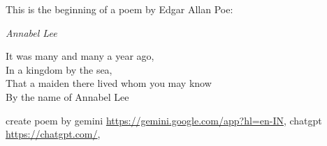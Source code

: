 \documentclass{article}
\begin{document}
\noindent This is the beginning of a poem by Edgar Allan Poe:
\begin{center}
	\emph{Annabel Lee}
\end{center}
\begin{center}
	It was many and many a year ago, \\
In a kingdom by the sea, \\
That a maiden there lived whom you may know \\
By the name of Annabel Lee
\end{center}

create poem by gemini \url{https://gemini.google.com/app?hl=en-IN}, chatgpt \url{https://chatgpt.com/},
\end{document}
